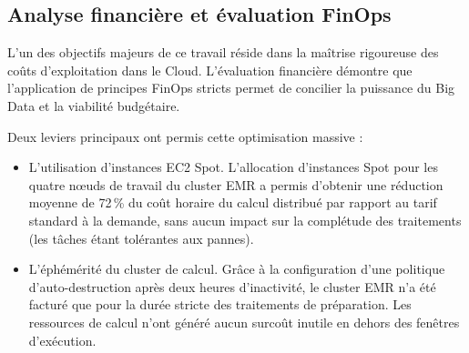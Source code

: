 

\subsection{Analyse financière et évaluation FinOps}
L'un des objectifs majeurs de ce travail réside dans la maîtrise rigoureuse des coûts d'exploitation dans le Cloud. L'évaluation financière démontre que l'application de principes FinOps stricts permet de concilier la puissance du Big Data et la viabilité budgétaire.

Deux leviers principaux ont permis cette optimisation massive :
\begin{itemize}
    \item[$\bullet$] L'utilisation d'instances EC2 Spot. L'allocation d'instances Spot pour les quatre nœuds de travail du cluster EMR a permis d'obtenir une réduction moyenne de 72\,\% du coût horaire du calcul distribué par rapport au tarif standard à la demande, sans aucun impact sur la complétude des traitements (les tâches étant tolérantes aux pannes).
    \item[$\bullet$] L'éphémérité du cluster de calcul. Grâce à la configuration d'une politique d'auto-destruction après deux heures d'inactivité, le cluster EMR n'a été facturé que pour la durée stricte des traitements de préparation. Les ressources de calcul n'ont généré aucun surcoût inutile en dehors des fenêtres d'exécution.
\end{itemize}

